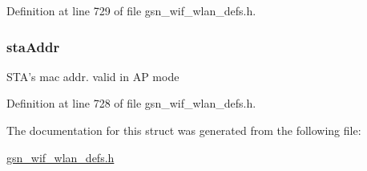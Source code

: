 Definition at line 729 of file gsn\_\-wif\_\-wlan\_\-defs.h.

\hypertarget{a00391_a3ca54ba7eb6c301c5b6584284a9ccb8b}{
\subsubsection[{staAddr}]{ {\bf staAddr}}}
\label{a00391_a3ca54ba7eb6c301c5b6584284a9ccb8b}
STA's mac addr. valid in AP mode 

Definition at line 728 of file gsn\_\-wif\_\-wlan\_\-defs.h.



The documentation for this struct was generated from the following file:\begin{DoxyCompactItemize}
\item 
\hyperlink{a00613}{gsn\_\-wif\_\-wlan\_\-defs.h}\end{DoxyCompactItemize}
